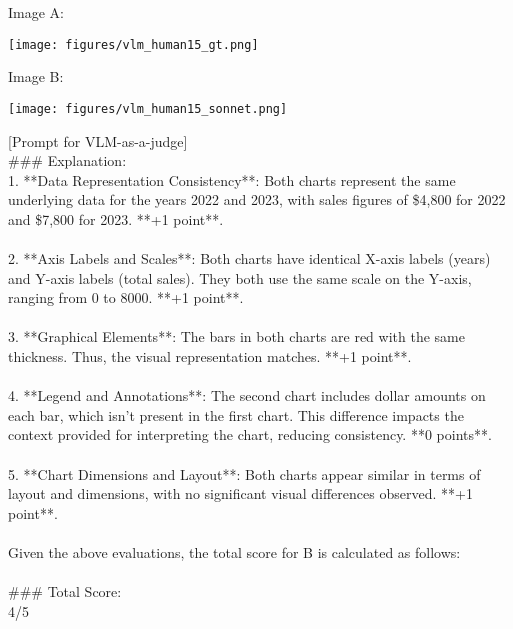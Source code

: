 \onecolumn
\begin{tcolorbox}[colback=blue!5!white, colframe=blue!75!black, title=Example \#1 of VLM-as-a-judge (Model: Claude-3-5-sonnet-20240620), text width=\textwidth]
Image A:\\
\begin{center}
    \texttt{[image: figures/vlm\_human15\_gt.png]}
\end{center}
Image B:\\
\begin{center}
    \texttt{[image: figures/vlm\_human15\_sonnet.png]}
\end{center}
[Prompt for VLM-as-a-judge]\\
\#\#\# Explanation:\\
1. **Data Representation Consistency**: Both charts represent the same underlying data for the years 2022 and 2023, with sales figures of \$4,800 for 2022 and \$7,800 for 2023. **+1 point**.\\
\\
2. **Axis Labels and Scales**: Both charts have identical X-axis labels (years) and Y-axis labels (total sales). They both use the same scale on the Y-axis, ranging from 0 to 8000. **+1 point**.\\
\\
3. **Graphical Elements**: The bars in both charts are red with the same thickness. Thus, the visual representation matches. **+1 point**.\\
\\
4. **Legend and Annotations**: The second chart includes dollar amounts on each bar, which isn’t present in the first chart. This difference impacts the context provided for interpreting the chart, reducing consistency. **0 points**.\\
\\
5. **Chart Dimensions and Layout**: Both charts appear similar in terms of layout and dimensions, with no significant visual differences observed. **+1 point**.\\
\\
Given the above evaluations, the total score for B is calculated as follows:\\
\\
\#\#\# Total Score:\\
4/5
\end{tcolorbox}
\twocolumn